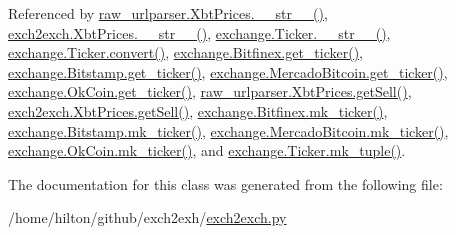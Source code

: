 Referenced by \hyperlink{raw__urlparser_8py_source_l00074}{raw\+\_\+urlparser.\+Xbt\+Prices.\+\_\+\+\_\+str\+\_\+\+\_\+()}, \hyperlink{exch2exch_8py_source_l00091}{exch2exch.\+Xbt\+Prices.\+\_\+\+\_\+str\+\_\+\+\_\+()}, \hyperlink{exchange_8py_source_l00111}{exchange.\+Ticker.\+\_\+\+\_\+str\+\_\+\+\_\+()}, \hyperlink{exchange_8py_source_l00065}{exchange.\+Ticker.\+convert()}, \hyperlink{exchange_8py_source_l00340}{exchange.\+Bitfinex.\+get\+\_\+ticker()}, \hyperlink{exchange_8py_source_l00409}{exchange.\+Bitstamp.\+get\+\_\+ticker()}, \hyperlink{exchange_8py_source_l00543}{exchange.\+Mercado\+Bitcoin.\+get\+\_\+ticker()}, \hyperlink{exchange_8py_source_l00608}{exchange.\+Ok\+Coin.\+get\+\_\+ticker()}, \hyperlink{raw__urlparser_8py_source_l00065}{raw\+\_\+urlparser.\+Xbt\+Prices.\+get\+Sell()}, \hyperlink{exch2exch_8py_source_l00073}{exch2exch.\+Xbt\+Prices.\+get\+Sell()}, \hyperlink{exchange_8py_source_l00354}{exchange.\+Bitfinex.\+mk\+\_\+ticker()}, \hyperlink{exchange_8py_source_l00423}{exchange.\+Bitstamp.\+mk\+\_\+ticker()}, \hyperlink{exchange_8py_source_l00557}{exchange.\+Mercado\+Bitcoin.\+mk\+\_\+ticker()}, \hyperlink{exchange_8py_source_l00622}{exchange.\+Ok\+Coin.\+mk\+\_\+ticker()}, and \hyperlink{exchange_8py_source_l00096}{exchange.\+Ticker.\+mk\+\_\+tuple()}.



The documentation for this class was generated from the following file\+:\begin{DoxyCompactItemize}
\item 
/home/hilton/github/exch2exh/\hyperlink{exch2exch_8py}{exch2exch.\+py}\end{DoxyCompactItemize}
